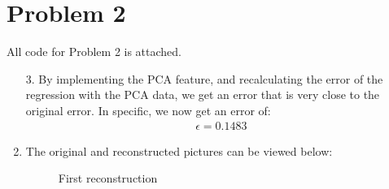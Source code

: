 \documentclass[letterpaper, 12pt]{article}
\begin{document}
\section*{Problem 2}
All code for Problem 2 is attached.

\begin{enumerate}
    \item[3.] By implementing the PCA feature, and recalculating the error of the regression with the PCA data, we get an error that is very close to the original error. In specific, we now get an error of:
    \begin{align*}\epsilon = 0.1483 \end{align*}
    \item The original and reconstructed pictures can be viewed below:
        \begin{figure}[!ht]
        \centering
        \hfill
        \caption{First reconstruction}
        \end{figure}
        \begin{figure}[!ht]
        \centering

\end{figure}
\end{enumerate}
\end{document}
